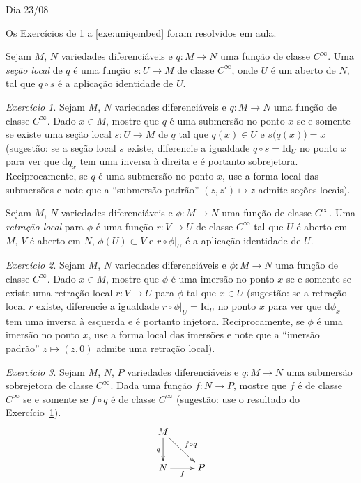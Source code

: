 \documentclass[oneside,11pt]{amsart}
\newcommand{\dd}{\mathrm d}
\newcommand{\Id}{\mathrm{Id}}
\theoremstyle{remark}\newtheorem{exercise}{Exercício}[section]
\theoremstyle{plain}\newtheorem{teo}{Teorema}[section]
\theoremstyle{plain}\newtheorem{lem}[teo]{Lema}
\theoremstyle{plain}\newtheorem{prop}[teo]{Proposição}
\theoremstyle{definition}\newtheorem{defin}[teo]{Definição}
\theoremstyle{remark}\newtheorem{rem}[teo]{Observação}
\theoremstyle{definition}\newtheorem{example}[teo]{Exemplo}
\numberwithin{equation}{section}
\begin{document}
\begin{section}{Dia 23/08}

Os Exercícios de \ref{exe:secaolocal} a \ref{exe:uniqembed} foram resolvidos em aula.

\medskip

Sejam $M$, $N$ variedades diferenciáveis e $q:M\to N$ uma função de classe $C^\infty$. Uma {\em seção local\/} de $q$ é uma função $s:U\to M$ de classe
$C^\infty$, onde $U$ é um aberto de $N$, tal que $q\circ s$ é a aplicação identidade de $U$.
\begin{exercise}\label{exe:secaolocal}
Sejam $M$, $N$ variedades diferenciáveis e $q:M\to N$ uma função de classe $C^\infty$. Dado $x\in M$, mostre que $q$ é uma submersão no ponto $x$
se e somente se existe uma seção local $s:U\to M$ de $q$ tal que $q(x)\in U$ e $s\big(q(x)\big)=x$ (sugestão: se a seção local $s$ existe, diferencie
a igualdade $q\circ s=\Id_U$ no ponto $x$ para ver que $\dd q_x$ tem uma inversa à direita e é portanto sobrejetora. Reciprocamente, se $q$ é uma submersão
no ponto $x$, use a forma local das submersões e note que a ``submersão padrão'' $(z,z')\mapsto z$ admite seções locais).
\end{exercise}

Sejam $M$, $N$ variedades diferenciáveis e $\phi:M\to N$ uma função de classe $C^\infty$. Uma {\em retração local\/} para $\phi$ é uma função
$r:V\to U$ de classe $C^\infty$ tal que $U$ é aberto em $M$, $V$ é aberto em $N$, $\phi(U)\subset V$ e $r\circ\phi\vert_U$ é a aplicação identidade de $U$.
\begin{exercise}\label{exe:retracaolocal}
Sejam $M$, $N$ variedades diferenciáveis e $\phi:M\to N$ uma função de classe $C^\infty$. Dado $x\in M$, mostre que $\phi$ é uma imersão no ponto $x$
se e somente se existe uma retração local $r:V\to U$ para $\phi$ tal que $x\in U$ (sugestão: se a retração local $r$ existe, diferencie a igualdade
$r\circ\phi\vert_U=\Id_U$ no ponto $x$ para ver que $\dd\phi_x$ tem uma inversa à esquerda e é portanto injetora. Reciprocamente, se $\phi$ é uma imersão no
ponto $x$, use a forma local das imersões e note que a ``imersão padrão'' $z\mapsto(z,0)$ admite uma retração local).
\end{exercise}

\begin{exercise}\label{exe:passquoc}
Sejam $M$, $N$, $P$ variedades diferenciáveis e $q:M\to N$ uma submersão sobrejetora de classe $C^\infty$. Dada uma função $f:N\to P$, mostre que
$f$ é de classe $C^\infty$ se e somente se $f\circ q$ é de classe $C^\infty$ (sugestão: use o resultado do Exercício~\ref{exe:secaolocal}).
\[\xymatrix{%
M\ar[dr]^{f\circ q}\ar[d]_q\\
N\ar[r]_f&P}\]
\end{exercise}


\end{section}
\end{document}
